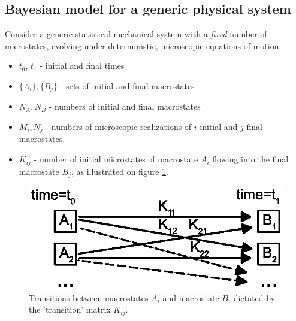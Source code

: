 \documentclass[a0]{sciposter}
\begin{document}
\begin{multicols}{3}



\section{Bayesian model for a generic physical system}
\normalsize
\begin{flushleft}
Consider a generic statistical mechanical system with a \textit{fixed} number of microstates, evolving under deterministic, microscopic equations of motion. 
\begin{itemize}
	\item $t_0$, $t_1$ - initial and final times
	\item $\{A_i\}, \{B_j\}$ - sets of initial and final macrostates
	\item $N_A, N_B$ - numbers of initial and final macrostates
	\item $M_i, N_j$ - numbers of microscopic realizations of $i$ initial and $j$ final macrostates.
	\item $K_{ij}$ - number of initial microstates of macrostate $A_i$ flowing into the final macrostate $B_j$, as illustrated on figure \ref{Fig4}.
\end{itemize}

\end{flushleft}

\begin{minipage}[b]{20.0cm}
\centering
\begin{figure}[ht!]
\includegraphics[width=20.0cm]{figure1.eps}
\caption{Transitions between macrostates ${A_i}$ and macrostate ${B_i}$ dictated by the 'transition' matrix $K_{ij}$.}
\label{Fig4} 
\end{figure}
\end{minipage}


\end{multicols}
\end{document}
